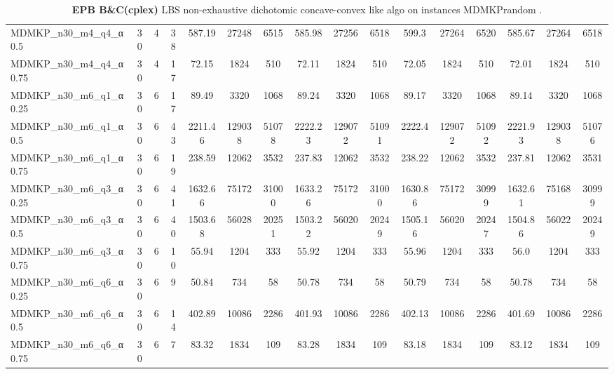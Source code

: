 \begin{sidewaystable}[!ht]
{\begin{tabular}{lccccccccccccccc}
MDMKP\_n30\_m4\_q4\_α0.5 & 30 & 4 & 38 & 587.19 & 27248 & 6515 & 585.98 & 27256 & 6518 & 599.3 & 27264 & 6520 & 585.67 & 27264 & 6518 \\
MDMKP\_n30\_m4\_q4\_α0.75 & 30 & 4 & 17 & 72.15 & 1824 & 510 & 72.11 & 1824 & 510 & 72.05 & 1824 & 510 &  \textcolor{blue2}{72.01} & 1824 & 510 \\
MDMKP\_n30\_m6\_q1\_α0.25 & 30 & 6 & 17 & 89.49 & 3320 & 1068 & 89.24 & 3320 & 1068 & 89.17 & 3320 & 1068 &  \textcolor{blue2}{89.14} & 3320 & 1068 \\
MDMKP\_n30\_m6\_q1\_α0.5 & 30 & 6 & 43 & 2211.46 & 129038 & 51078 & 2222.23 & 129072 & 51091 & 2222.4 & 129072 & 51092 & 2221.93 & 129038 & 51076 \\
MDMKP\_n30\_m6\_q1\_α0.75 & 30 & 6 & 19 & 238.59 & 12062 & 3532 & 237.83 & 12062 & 3532 & 238.22 & 12062 & 3532 &  \textcolor{blue2}{237.81} & 12062 & 3531 \\
MDMKP\_n30\_m6\_q3\_α0.25 & 30 & 6 & 41 & 1632.66 & 75172 & 31000 & 1633.26 & 75172 & 31000 &  \textcolor{blue2}{1630.86} & 75172 & 30999 & 1632.61 & 75168 & 30999 \\
MDMKP\_n30\_m6\_q3\_α0.5 & 30 & 6 & 40 & 1503.68 & 56028 & 20251 & 1503.22 & 56020 & 20249 & 1505.16 & 56020 & 20247 & 1504.86 & 56022 & 20249 \\
MDMKP\_n30\_m6\_q3\_α0.75 & 30 & 6 & 10 & 55.94 & 1204 & 333 &  \textcolor{blue2}{55.92} & 1204 & 333 & 55.96 & 1204 & 333 & 56.0 & 1204 & 333 \\
MDMKP\_n30\_m6\_q6\_α0.25 & 30 & 6 & 9 & 50.84 & 734 & 58 & 50.78 & 734 & 58 & 50.79 & 734 & 58 & 50.78 & 734 & 58 \\
MDMKP\_n30\_m6\_q6\_α0.5 & 30 & 6 & 14 & 402.89 & 10086 & 2286 & 401.93 & 10086 & 2286 & 402.13 & 10086 & 2286 &  \textcolor{blue2}{401.69} & 10086 & 2286 \\
MDMKP\_n30\_m6\_q6\_α0.75 & 30 & 6 & 7 & 83.32 & 1834 & 109 & 83.28 & 1834 & 109 & 83.18 & 1834 & 109 &  \textcolor{blue2}{83.12} & 1834 & 109 \\
\bottomrule
\end{tabular}
}%
\caption{\textbf{EPB B\&C(cplex) }LBS non-exhaustive dichotomic concave-convex like algo on instances MDMKPrandom .}
\label{tab:table2_lambda_EPB_MDMKPrandom }
\end{sidewaystable}
